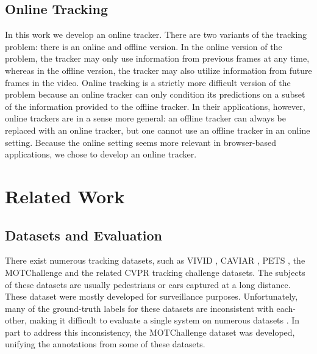 \documentclass[10pt,twocolumn,letterpaper]{article}
\begin{document}
\subsection{Online Tracking}
In this work we develop an online tracker. There are two variants of the tracking problem: there is an online and offline version. In the online version of the problem, the tracker may only use information from previous frames at any time, whereas in the offline version, the tracker may also utilize information from future frames in the video. Online tracking is a strictly more difficult version of the problem because an online tracker can only condition its predictions on a subset of the information provided to the offline tracker. In their applications, however, online trackers are in a sense more general: an offline tracker can always be replaced with an online tracker, but one cannot use an offline tracker in an online setting.
Because the online setting seems more relevant in browser-based applications, we chose to develop an online tracker.


\section{Related Work}
\subsection{Datasets and Evaluation}
There exist numerous tracking datasets, such as VIVID \cite{VIVID_dataset}, CAVIAR \cite{datasets_survey}, PETS \cite{PETS_dataset}, the MOTChallenge \cite{motchallenge2015} and the related CVPR tracking challenge \cite{cvpr2019challenge} datasets.
The subjects of these datasets are usually pedestrians or cars captured at a long distance. These dataset were mostly developed for surveillance purposes.
Unfortunately, many of the ground-truth labels for these datasets are inconsistent with each-other, making it difficult to evaluate a single system on numerous datasets \cite{tracking_benchmark} \cite{motchallenge2015}.
In part to address this inconsistency, the MOTChallenge dataset \cite{motchallenge2015} was developed, unifying the annotations from some of these datasets.
\end{document}
